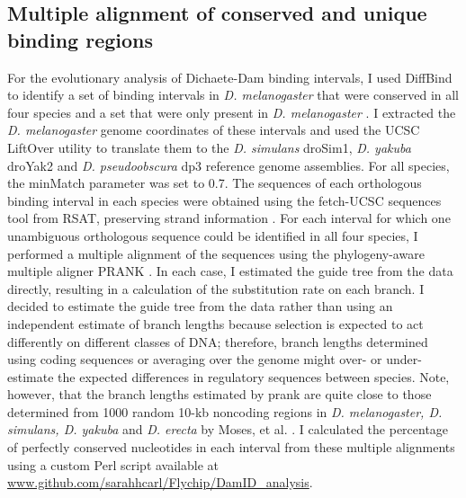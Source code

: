 \subsection{Multiple alignment of conserved and unique binding regions}
For the evolutionary analysis of Dichaete-Dam binding intervals, I used DiffBind to identify a set of binding intervals in \emph{D. melanogaster} that were conserved in all four species and a set that were only present in \emph{D. melanogaster} \citep{ross-innes_differential_2012}. I extracted the \emph{D. melanogaster} genome coordinates of these intervals and used the UCSC LiftOver utility to translate them to the \emph{D. simulans} droSim1, \emph{D. yakuba} droYak2 and \emph{D. pseudoobscura} dp3 reference genome assemblies. For all species, the minMatch parameter was set to 0.7. The sequences of each orthologous binding interval in each species were obtained using the fetch-UCSC sequences tool from RSAT, preserving strand information \citep{thomas-chollier_rsat_2011}. For each interval for which one unambiguous orthologous sequence could be identified in all four species, I performed a multiple alignment of the sequences using the phylogeny-aware multiple aligner PRANK \citep{loytynoja_algorithm_2005,loytynoja_phylogeny-aware_2008}. In each case, I estimated the guide tree from the data directly, resulting in a calculation of the substitution rate on each branch. I decided to estimate the guide tree from the data rather than using an independent estimate of branch lengths because selection is expected to act differently on different classes of DNA; therefore, branch lengths determined using coding sequences or averaging over the genome might over- or under-estimate the expected differences in regulatory sequences between species. Note, however, that the branch lengths estimated by prank are quite close to those determined from 1000 random 10-kb noncoding regions in \emph{D. melanogaster, D. simulans, D. yakuba} and \emph{D. erecta} by Moses, et al. \citet{moses_large-scale_2006}. I calculated the percentage of perfectly conserved nucleotides in each interval from these multiple alignments using a custom Perl script available at \url{www.github.com/sarahhcarl/Flychip/DamID_analysis}.

